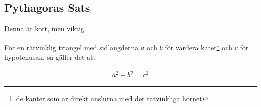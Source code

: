 \newpage
\subsection{Pythagoras Sats}
\label{Pythagoras Sats}

Denna är kort, men viktig. 

\begin{theorem}
	För en rätvinklig triangel med sidlängderna $a$ och $b$ för vardera katet\footnote{de kanter som är direkt anslutna med det rätvinkliga hörnet} och $c$ för hypotenusan, så gäller det att 

	\begin{align}
		a^2+b^2=c^2
	\end{align}
\end{theorem}
























































